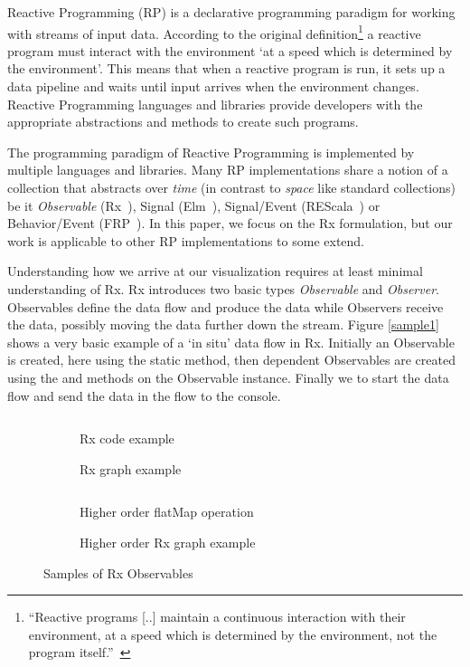 \label{nutshell}
Reactive Programming (RP) is a declarative programming paradigm for working with streams of input data. 
According to the original definition\footnote{
``Reactive programs [..] maintain a continuous interaction with their environment, at a speed which is determined by the environment, not the program itself.''~\cite{berry1989real}
} a reactive program must interact with the environment `at a speed which is determined by the environment'.
This means that when a reactive program is run, it sets up a data pipeline and waits until input arrives when the environment changes.
Reactive Programming languages and libraries provide developers with the appropriate abstractions and methods to create such programs.

The programming paradigm of Reactive Programming is implemented by multiple languages and libraries. Many RP implementations share a notion of a collection that abstracts over \textit{time} (in contrast to \textit{space} like standard collections) be it \textit{Observable} (Rx~\cite{meijer2010subject}), Signal (Elm~\cite{czaplicki2012elm}), Signal/Event (REScala~\cite{salvaneschi2014rescala}) or Behavior/Event (FRP~\cite{elliott1997functional}). In this paper, we focus on the Rx formulation, but our work is applicable to other RP implementations to some extend. 

Understanding how we arrive at our visualization requires at least minimal understanding of Rx.
Rx introduces two basic types \textit{Observable} and \textit{Observer}. Observables define the data flow and produce the data while Observers receive the data, possibly moving the data further down the stream. Figure \ref{sample1} shows a very basic example of a `in situ' data flow in Rx. Initially an Observable is created, here using the static  method, then dependent Observables are created using the  and  methods on the Observable instance. Finally we  to start the data flow and send the data in the flow to the console.

\begin{figure*}[h!]
\centering

\begin{subfigure}[t]{\columnwidth}
	\inputminted[tabsize=2]{javascript}{listings/sample1.js}	
	\par\bigskip
	\caption{Rx code example}
	\label{sample1}
	\par\medskip
	
	\caption{Rx graph example}
	\label{chaincreate}
\end{subfigure}
\begin{subfigure}[t]{\columnwidth}
	\inputminted[tabsize=2]{javascript}{listings/sample3.js}	
	\caption{Higher order flatMap operation}
	\label{sample3}
	\par\medskip
	
	\caption{Higher order Rx graph example}
	\label{chainhigher}
\end{subfigure}

\caption{Samples of Rx Observables}

\end{figure*}

